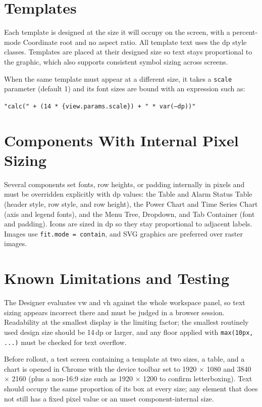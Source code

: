 \section{Templates}
Each template is designed at the size it will occupy on the screen, with a percent-mode Coordinate root and no aspect ratio. All template text uses the dp style classes. Templates are placed at their designed size so text stays proportional to the graphic, which also supports consistent symbol sizing across screens.

When the same template must appear at a different size, it takes a \texttt{scale} parameter (default 1) and its font sizes are bound with an expression such as:
\begin{center}\texttt{"calc(" + (14 * \{view.params.scale\}) + " * var(--dp))"}\end{center}

\section{Components With Internal Pixel Sizing}
Several components set fonts, row heights, or padding internally in pixels and must be overridden explicitly with dp values: the Table and Alarm Status Table (header style, row style, and row height), the Power Chart and Time Series Chart (axis and legend fonts), and the Menu Tree, Dropdown, and Tab Container (font and padding). Icons are sized in dp so they stay proportional to adjacent labels. Images use \texttt{fit.\allowbreak{}mode = contain}, and SVG graphics are preferred over raster images.

\section{Known Limitations and Testing}
The Designer evaluates vw and vh against the whole workspace panel, so text sizing appears incorrect there and must be judged in a browser session. Readability at the smallest display is the limiting factor; the smallest routinely used design size should be 14\,dp or larger, and any floor applied with \texttt{max(10px, ...)} must be checked for text overflow.

Before rollout, a test screen containing a template at two sizes, a table, and a chart is opened in Chrome with the device toolbar set to 1920 $\times$ 1080 and 3840 $\times$ 2160 (plus a non-16:9 size such as 1920 $\times$ 1200 to confirm letterboxing). Text should occupy the same proportion of its box at every size; any element that does not still has a fixed pixel value or an unset component-internal size.
